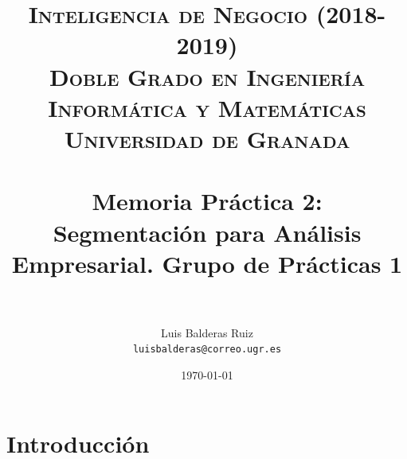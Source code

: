 
\graphicspath{ {./images/} }


\title{	
	\normalfont \normalsize 
	\textsc{\textbf{Inteligencia de Negocio (2018-2019)} \\ Doble Grado en Ingeniería Informática y Matemáticas \\ Universidad de Granada} \\ [25pt] %
	\horrule{0.5pt} \\[0.4cm] %
	\huge Memoria Práctica 2: \\ Segmentación para Análisis Empresarial. Grupo de Prácticas 1 \\ %
	\horrule{2pt} \\[0.5cm] %
}

\author{Luis Balderas Ruiz \\ \texttt{luisbalderas@correo.ugr.es}} 

\date{\normalsize\today} %



	
\maketitle %
	
\newpage %
	
\tableofcontents %
	
\listoffigures
	
\listoftables
	
\newpage




\section{Introducción}

